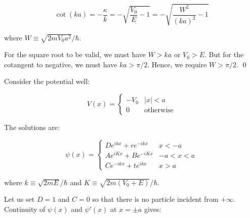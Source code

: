 \documentclass[12pt]{article}
\begin{document}
\begin{equation}
    \cot{(ka)} = -\frac{\kappa}{k} = -\sqrt{\frac{V_{0}}{E} - 1} = -\sqrt{\frac{W^{2}}{(ka)^{2}} - 1}
\end{equation}

where $W \equiv \sqrt{2mV_{0}a^{2}}/\hbar$.

For the square root to be valid, we must have $W > ka$ or $V_{0} > E$. But for the cotangent to negative, we must have $ka > \pi/2$. Hence, we require $W > \pi/2$.
\qed






Consider the potential well:

\begin{equation}
    V(x) =
    \begin{cases}
        -V_{0} & \left\lvert x \right\rvert < a \\
        0 & \text{otherwise}
    \end{cases}
\end{equation}

The solutions are:

\begin{equation}
    \psi(x) =
    \begin{cases}
        De^{ikx} + re^{-ikx} & x < -a \\
        Ae^{iKx} + Be^{-iKx} & -a < x < a \\
        Ce^{-ikx} + te^{ikx} & x > a
    \end{cases}
\end{equation}

where $k \equiv \sqrt{2mE}/\hbar$ and $K \equiv \sqrt{2m(V_{0} + E)}/\hbar$.

Let us set $D = 1$ and $C = 0$ so that there is no particle incident from $+\infty$. Continuity of $\psi(x)$ and $\psi'(x)$ at $x = \pm a$ gives:
\end{document}
